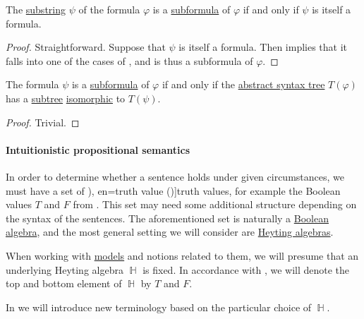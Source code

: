 \begin{proposition}\label{thm:propositional_formula_characterization}
  The \hyperref[def:formal_language/subword]{substring} \( \psi \) of the formula \( \varphi \) is a \hyperref[def:propositional_subformula]{subformula} of \( \varphi \) if and only if \( \psi \) is itself a formula.
\end{proposition}
\begin{proof}
  \SufficiencySubProof Straightforward.
  \NecessitySubProof Suppose that \( \psi \) is itself a formula. Then  implies that it falls into one of the cases of , and is thus a subformula of \( \varphi \).
\end{proof}

\begin{proposition}\label{thm:propositional_ast_subformula}
  The formula \( \psi \) is a \hyperref[def:propositional_subformula]{subformula} of \( \varphi \) if and only if the \hyperref[def:propositional_formula_ast]{abstract syntax tree} \( T(\varphi) \) has a \hyperref[def:tree/subtree]{subtree} \hyperref[def:labeled_tree/homomorphism]{isomorphic} to \( T(\psi) \).
\end{proposition}
\begin{proof}
  Trivial.
\end{proof}

\paragraph{Intuitionistic propositional semantics}

\begin{definition}\label{def:truth_value_algebra}
  In order to determine whether a sentence holds under given circumstances, we must have a set of \term[ru=истинностное значение (\cite[17]{Герасимов2011}), en=truth value (\cite[9]{Smullyan1995})]{truth values}, for example the Boolean values \( T \) and \( F \) from . This set may need some additional structure depending on the syntax of the sentences. The aforementioned set is naturally a \hyperref[def:boolean_algebra]{Boolean algebra}, and the most general setting we will consider are \hyperref[def:heyting_algebra]{Heyting algebras}.

  When working with \hyperref[def:institution/models]{models} and notions related to them, we will presume that an underlying Heyting algebra \( \BbbH \) is fixed. In accordance with , we will denote the top and bottom element of \( \BbbH \) by \( T \) and \( F \).
\end{definition}
\begin{comments}
  \item In  we will introduce new terminology based on the particular choice of \( \BbbH \).
\end{comments}

